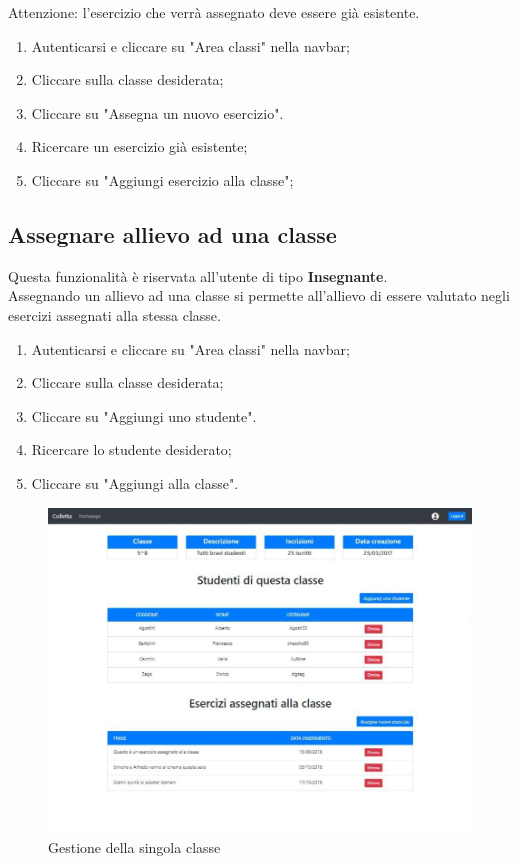 \documentclass[11pt,a4paper]{article}
\begin{document}
{		Attenzione: l'esercizio che verrà assegnato deve essere già esistente.
		
		\begin{enumerate}
			\item Autenticarsi e cliccare su "Area classi" nella navbar;
			\item Cliccare sulla classe desiderata;
			\item Cliccare su "Assegna un nuovo esercizio".
			\item Ricercare un esercizio già esistente;
			\item Cliccare su "Aggiungi esercizio alla classe";
		\end{enumerate}
		
		\subsection{Assegnare allievo ad una classe}
		Questa funzionalità è riservata all'utente di tipo \textbf{Insegnante}.\\
		Assegnando un allievo ad una classe si permette all'allievo di essere valutato negli esercizi assegnati alla stessa classe.
		
		\begin{enumerate}
			\item Autenticarsi e cliccare su "Area classi" nella navbar;
			\item Cliccare sulla classe desiderata;
			\item Cliccare su "Aggiungi uno studente".
			\item Ricercare lo studente desiderato;
			\item Cliccare su "Aggiungi alla classe".
		\end{enumerate}
	
		\begin{figure}[h!]
		\centering
		\includegraphics[scale=0.65]{images/gestioneclasse.jpg}
		\caption{Gestione della singola classe}
	\end{figure}
			
}
\end{document}
